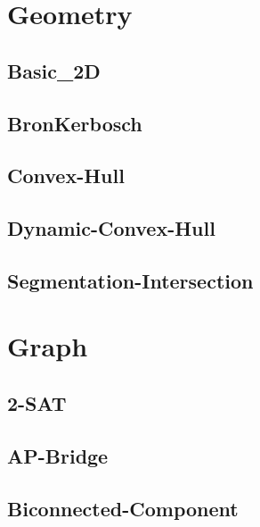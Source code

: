 \documentclass[a4paper,10pt,twocolumn,oneside]{article}
\begin{document}
\section{Geometry}
\subsection{Basic_2D}


\subsection{BronKerbosch}


\subsection{Convex-Hull}


\subsection{Dynamic-Convex-Hull}


\subsection{Segmentation-Intersection}


\section{Graph}
\subsection{2-SAT}


\subsection{AP-Bridge}


%

\subsection{Biconnected-Component}

\end{document}
